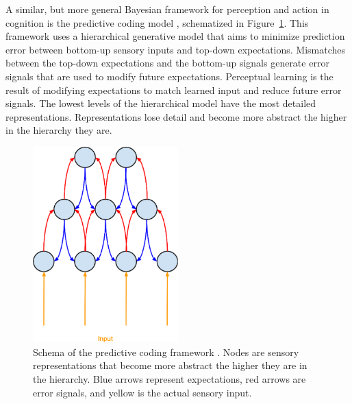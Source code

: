A similar, but more general Bayesian framework for perception and action in cognition is the predictive coding model \citep{Clark2013}, schematized in Figure~\ref{fig:predictivecoding}.
This framework uses a hierarchical generative model that aims to minimize prediction error between bottom-up sensory inputs and top-down expectations.  
Mismatches between the top-down expectations and the bottom-up signals generate error signals that are used to modify future expectations.  
Perceptual learning is the result of modifying expectations to match learned input and reduce future error signals.
The lowest levels of the hierarchical model have the most detailed representations.
Representations lose detail and become more abstract the higher in the hierarchy they are.

\begin{figure}[!ht]
\caption{Schema of the predictive coding framework \citep{Clark2013}.  Nodes are sensory representations that become more abstract the higher they are in the hierarchy. Blue arrows represent expectations, red arrows are error signals, and yellow is the actual sensory input.}
\label{fig:predictivecoding}
\begin{center}
\includegraphics[width=0.5\textwidth]{pictures/predictive_coding}
\end{center}
\end{figure}


